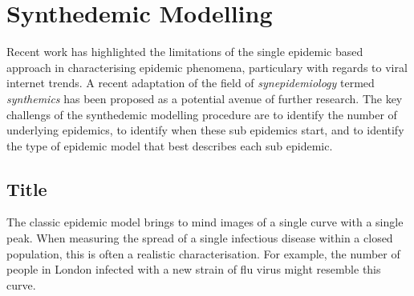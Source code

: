 \chapter{Synthedemic Modelling}
\label{ch:multi}

Recent work has highlighted the limitations of the single epidemic
based approach in characterising epidemic phenomena, particulary with
regards to viral internet trends.\cite{marily2013, marily2014} A
recent adaptation of the field of \emph{synepidemiology} termed
\emph{synthemics} has been proposed as a potential avenue of further
research. The key challengs of the synthedemic modelling procedure are to
identify the number of underlying epidemics, to identify when these
sub epidemics start, and to identify the type of epidemic model that
best describes each sub epidemic.

\section{Title}
The classic epidemic model brings to mind images of a single curve
with a single peak. When measuring the spread of a single infectious
disease within a closed population, this is often a realistic
characterisation. For example, the number of people in London infected
with a new strain of flu virus might resemble this curve. 
